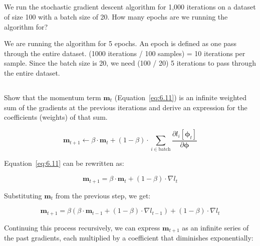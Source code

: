\documentclass[12pt]{report}
\begin{document}
\subsection{}
\begin{mdframed}
    We run the stochastic gradient descent algorithm for 1,000 iterations on a dataset
    of size 100 with a batch size of 20. How many epochs are we running the algorithm for?
\end{mdframed}

We are running the algorithm for 5 epochs. An epoch is defined as one pass through the entire dataset. (1000 iterations / 100 samples) = 10 iterations per sample. Since the batch size is 20, we need (100 / 20) 5 iterations to pass through the entire dataset.

\subsection{}
\begin{mdframed}
    Show that the momentum term $\mathbf{m}_{t}$ (Equation~\ref{eq:6.11}) is an infinite weighted sum of the gradients at the previous iterations and derive an expression for the coefficients (weights) of that sum.

    \begin{equation}
        \mathbf{m}_{t+1} \leftarrow \beta\cdot\mathbf{m}_{t} + (1 - \beta)\cdot\sum_{i \in \text{batch}}\frac{\partial l_{i}[\boldsymbol{\phi}_{t}]}{\partial \boldsymbol{\phi}}
        \tag{6.11}
        \label{eq:6.11}
    \end{equation}
\end{mdframed}

Equation~\ref{eq:6.11} can be rewritten as:

\begin{equation*}
    \mathbf{m}_{t+1} = \beta\cdot\mathbf{m}_{t} + (1 - \beta)\cdot\nabla l_{t}
\end{equation*}

Substituting $\mathbf{m}_{t}$ from the previous step, we get:

\begin{equation*}
    \mathbf{m}_{t+1} = \beta(\beta\cdot\mathbf{m}_{t-1} + (1 - \beta)\cdot\nabla l_{t-1}) + (1 - \beta)\cdot\nabla l_{t}
\end{equation*}

Continuing this process recursively, we can express $\mathbf{m}_{t+1}$ as an infinite series of the past gradients, each multiplied by a coefficient that diminishes exponentially:
\end{document}
